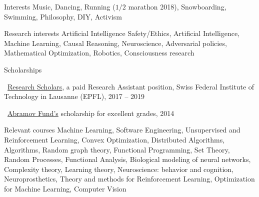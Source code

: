 \documentclass{resume} %
\newcommand*{\mybold}[1]{{\color{pinkunderline} #1}}
\newcommand{\mylink}{{\color{gray}\faExternalLink}}
\begin{document}
\begin{rSection}{Interests}
	Music, Dancing, Running ($1/2$ marathon 2018), Snowboarding, Swimming, Philosophy, DIY, Activism
\end{rSection}

\begin{rSection}{Research interests}
	Artificial Intelligence Safety/Ethics, Artificial Intelligence, Machine Learning, Causal Reasoning, Neuroscience, Adversarial policies, Mathematical Optimization, Robotics, Consciousness research %
\end{rSection}

\begin{rSection}{Scholarships}
	\vspace{-1em}
	\item \mylink~\href{https://www.epfl.ch/schools/ic/education/master/research-scholars/}{Research Scholars}, a paid \mybold{Research Assistant} position, Swiss Federal Institute of Technology in Lausanne (EPFL), 2017 -- 2019
	\item \mylink~\href{https://web.archive.org/web/20190730104204/http://phystech-foundation.org/}{Abramov Fund's} scholarship for excellent \mybold{grades,} 2014
\end{rSection}

\begin{rSection}{Relevant courses}
	\mybold{Machine Learning, Software Engineering,} {\small Unsupervised and Reinforcement Learning, Convex Optimization, Distributed Algorithms, Algorithms, Random graph theory, Functional Programming, Set Theory, Random Processes, Functional Analysis, Biological modeling of neural networks, Complexity theory, Learning theory, Neuroscience: behavior and cognition, Neuroprosthetics, Theory and methods for Reinforcement Learning, Optimization for Machine Learning, Computer Vision}
\end{rSection}

\end{document}
